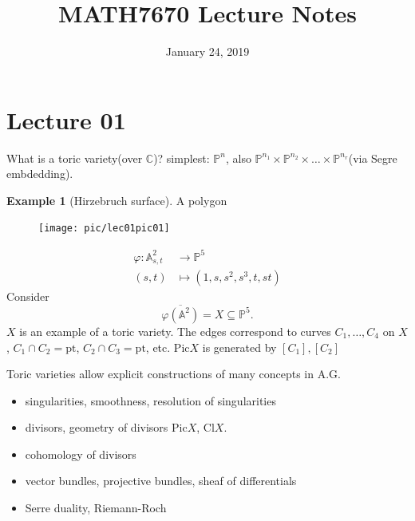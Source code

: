 \documentclass[a4paper,12pt]{amsart}
\title{MATH7670 Lecture Notes}
\author{}
\date{January 24, 2019}
\newcommand{\CC}{\mathbb{C}}
\newcommand{\PP}{\mathbb{P}}
\begin{document}
\maketitle
\newtheorem{Lemma}{Lemma}
\newtheorem{Proposition}{Proposition}[section]
\newtheorem{Theorem}{Theorem}[section]
\newtheorem{Corollary}{Corollary}
\newtheorem*{Conjecture}{Conjecture}
\newtheorem{theorem}{Theorem}[section]
\newtheorem{corollary}[theorem]{Corollary}

\theoremstyle{definition}
\newtheorem*{Problem}{Problem}
\newtheorem*{Def}{Definition}
\newtheorem{Eg}{Example}[section]
\newtheorem*{exercise}{Exercise}
\newtheorem{remark}{Remark}
\newtheorem{example}{Example}
\newtheorem{proposition}{Proposition}
\newtheorem{definition}{Definition}

\theoremstyle{remark}
\newtheorem*{Remark}{Remark}
\newtheorem*{Caution}{\bf{Caution}}
\newtheorem*{Fact}{Fact}
\newtheorem*{Note}{Note}

\tableofcontents
\newpage
\section{Lecture 01}

What is a toric variety(over $\CC$)? simplest: $\PP^n$, also $\PP^{n_1}\times\PP^{n_2}\times\dots\times\PP^{n_r}$(via Segre embdedding).

\begin{Eg}[Hirzebruch surface]
A polygon
\begin{figure}[h]
\centering
\texttt{[image: pic/lec01pic01]}
\end{figure}
\begin{align*}
\varphi:\mathbb{A}^2_{s,t}&\rightarrow\PP^5\\
(s,t)&\mapsto(1,s,s^2,s^3,t,st)
\end{align*}
Consider
\begin{equation*}
\overline{\varphi(\mathbb{A}^2)}=X\subseteq\PP^5.
\end{equation*}
$X$ is an example of a toric variety.
The edges correspond to curves $C_1,\dots,C_4$ on $X$, $C_1\cap C_2=\text{pt}$, $C_2\cap C_3=\text{pt}$, etc. $\text{Pic}X$ is generated by $[C_1],[C_2]$
\end{Eg}
Toric varieties allow explicit constructions of many concepts in A.G.
\begin{itemize}
\item singularities, smoothness, resolution of singularities 
\item divisors, geometry of divisors $\text{Pic}X$, $\text{Cl}X$.
\item cohomology of divisors
\item vector bundles, projective bundles, sheaf of differentials
\item  Serre duality, Riemann-Roch
\end{itemize}
\end{document}
